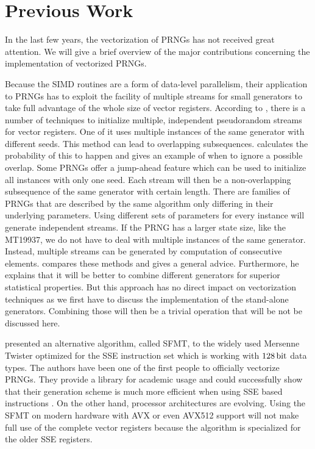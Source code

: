 \documentclass{stdlocal}
\begin{document}
\section{Previous Work} %
\label{sec:previous_work}
  In the last few years, the vectorization of PRNGs has not received great attention.
  We will give a brief overview of the major contributions concerning the implementation of vectorized PRNGs.

  Because the SIMD routines are a form of data-level parallelism, their application to PRNGs has to exploit the facility of multiple streams for small generators to take full advantage of the whole size of vector registers.
  According to \textcite{fog2015}, there is a number of techniques to initialize multiple, independent pseudorandom streams for vector registers.
  One of it uses multiple instances of the same generator with different seeds.
  This method can lead to overlapping subsequences.
  \citeauthor{fog2015} calculates the probability of this to happen and gives an example of when to ignore a possible overlap.
  Some PRNGs offer a jump-ahead feature which can be used to initialize all instances with only one seed.
  Each stream will then be a non-overlapping subsequence of the same generator with certain length.
  There are families of PRNGs that are described by the same algorithm only differing in their underlying parameters.
  Using different sets of parameters for every instance will generate independent streams.
  If the PRNG has a larger state size, like the MT19937, we do not have to deal with multiple instances of the same generator.
  Instead, multiple streams can be generated by computation of consecutive elements.
  \citeauthor{fog2015} compares these methods and gives a general advice.
  Furthermore, he explains that it will be better to combine different generators for superior statistical properties.
  But this approach has no direct impact on vectorization techniques as we first have to discuss the implementation of the stand-alone generators.
  Combining those will then be a trivial operation that will be not be discussed here.

  \textcite{saito2008} presented an alternative algorithm, called SFMT, to the widely used Mersenne Twister optimized for the SSE instruction set which is working with $128\, \mathrm{bit}$ data types.
  The authors have been one of the first people to officially vectorize PRNGs.
  They provide a library for academic usage and could successfully show that their generation scheme is much more efficient when using SSE based instructions \autocite{sfmt}.
  On the other hand, processor architectures are evolving.
  Using the SFMT on modern hardware with AVX or even AVX512 support will not make full use of the complete vector registers because the algorithm is specialized for the older SSE registers.
\end{document}
